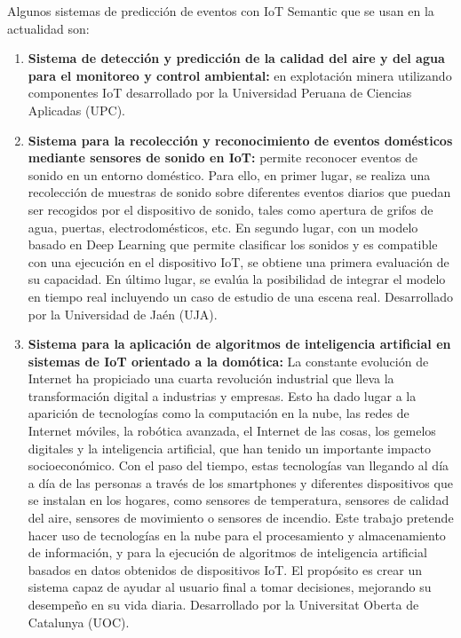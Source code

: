 \documentclass[12pt]{article}
\begin{document}
Algunos sistemas de predicción de eventos con IoT Semantic que se usan en la actualidad son:

\begin{enumerate}
    \item {
       
    \textbf{Sistema de detección y predicción de la calidad del aire y del agua para el monitoreo y control ambiental:} \citep{ref53} en explotación minera utilizando componentes IoT desarrollado por la Universidad Peruana de Ciencias Aplicadas (UPC).
    
    }
    \item {
    
    \textbf{Sistema para la recolección y reconocimiento de eventos domésticos mediante sensores de sonido en IoT:} \citep{ref54} permite reconocer eventos de sonido en un entorno doméstico. Para ello, en primer lugar, se realiza una recolección de muestras de sonido sobre diferentes eventos diarios que puedan ser recogidos por el dispositivo de sonido, tales como apertura de grifos de agua, puertas, electrodomésticos, etc. En segundo lugar, con un modelo basado en Deep Learning que permite clasificar los sonidos y es compatible con una ejecución en el dispositivo IoT, se obtiene una primera evaluación de su capacidad. En último lugar, se evalúa la posibilidad de integrar el modelo en tiempo real incluyendo un caso de estudio de una escena real. Desarrollado por la Universidad de Jaén (UJA).
    }
    \item {
        
    \textbf{Sistema para la aplicación de algoritmos de inteligencia artificial en sistemas de IoT orientado a la domótica:} \citep{ref55} La constante evolución de Internet ha propiciado una cuarta revolución industrial que lleva la transformación digital a industrias y empresas. Esto ha dado lugar a la aparición de tecnologías como la computación en la nube, las redes de Internet móviles, la robótica avanzada, el Internet de las cosas, los gemelos digitales y la inteligencia artificial, que han tenido un importante impacto socioeconómico. Con el paso del tiempo, estas tecnologías van llegando al día a día de las personas a través de los smartphones y diferentes dispositivos que se instalan en los hogares, como sensores de temperatura, sensores de calidad del aire, sensores de movimiento o sensores de incendio. Este trabajo pretende hacer uso de tecnologías en la nube para el procesamiento y almacenamiento de información, y para la ejecución de algoritmos de inteligencia artificial basados en datos obtenidos de dispositivos IoT. El propósito es crear un sistema capaz de ayudar al usuario final a tomar decisiones, mejorando su desempeño en su vida diaria. Desarrollado por la Universitat Oberta de Catalunya (UOC).



    }
        
\end{enumerate}
\end{document}
